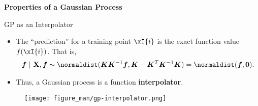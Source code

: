 \begin{frame}[c]{}
\centering
\huge
\textbf{Properties of a Gaussian Process}
\end{frame}
\begin{frame}[c]{GP as an Interpolator}

\begin{itemize}

\item The  ``prediction'' for a training point $\xI{i}$ is the exact function value $f(\xI{i})$. That is, 
\begin{eqnarray*}
\bm{f} ~|~ \Xmat, \bm{f} \sim \normaldist(\Kmat\Kmat^{-1}\bm{f}, \Kmat - \Kmat^T \Kmat^{-1} \Kmat) = \normaldist(\bm{f}, \bm{0}).
\end{eqnarray*}

\item Thus, a Gaussian process is a function \textbf{interpolator}.
\end{itemize}

\begin{figure}
\texttt{[image: figure\_man/gp-interpolator.png]}\par
\end{figure}

\end{frame}

